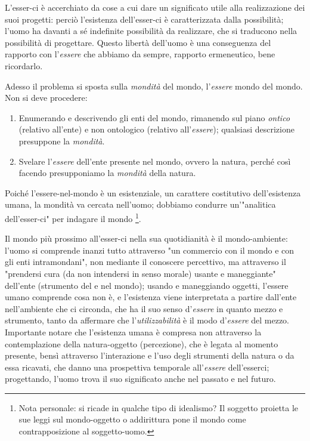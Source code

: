 \documentclass[a4paper,12pt,oneside]{article}%
\begin{document}
L’esser-ci è accerchiato da cose a cui dare un significato utile alla realizzazione dei suoi progetti: perciò l’esistenza dell’esser-ci è caratterizzata dalla possibilità; l’uomo ha davanti a sé indefinite possibilità da realizzare, che si traducono nella possibilità di progettare. Questo libertà dell'uomo è una conseguenza del rapporto con l'\textit{essere} che abbiamo da sempre, rapporto ermeneutico, bene ricordarlo.

Adesso il problema si sposta sulla \textit{mondità} del mondo, l'\textit{essere} mondo del mondo. Non si deve procedere:

\begin{enumerate}
	\item Enumerando e descrivendo gli enti del mondo, rimanendo sul piano \textit{ontico} (relativo all'ente) e non ontologico (relativo all'\textit{essere}); qualsiasi descrizione presuppone la \textit{mondità}.
	\item Svelare l'\textit{essere} dell'ente presente nel mondo, ovvero la natura, perché così facendo presupponiamo la \textit{mondità} della natura.
\end{enumerate}

Poiché l'essere-nel-mondo è un esistenziale, un carattere costitutivo dell'esistenza umana, la mondità va cercata nell'uomo; dobbiamo condurre un'"analitica dell'esser-ci" per indagare il mondo \footnote{Nota personale: si ricade in qualche tipo di idealismo? Il soggetto proietta le sue leggi sul mondo-oggetto o addirittura pone il mondo come contrapposizione al soggetto-uomo.}.
	
Il mondo più prossimo all'esser-ci nella sua quotidianità è il mondo-ambiente: l'uomo si comprende inanzi tutto attraverso "un commercio con il mondo e con gli enti intramondani", non mediante il conoscere percettivo, ma attraverso il "prendersi cura (da non intendersi in senso morale) usante e maneggiante" dell'ente (strumento del e nel mondo); usando e maneggiando oggetti, l'essere umano comprende cosa non è, e l'esistenza viene interpretata a partire dall'ente nell'ambiente che ci circonda, che ha il suo senso d'\textit{essere} in quanto mezzo e strumento, tanto da affermare che l'\textit{utilizzabilità} è il modo d'\textit{essere} del mezzo. Importante notare che l'esistenza umana è compresa non attraverso la contemplazione della natura-oggetto (percezione), che è legata al momento presente, bensì attraverso l'interazione e l'uso degli strumenti della natura o da essa ricavati, che danno una prospettiva temporale all'\textit{essere} dell'esserci; progettando, l'uomo trova il suo significato anche nel passato e nel futuro.
\end{document}
